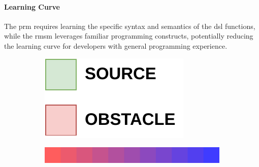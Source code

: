 \paragraph{Learning Curve}

The \ac{prm} requires learning the specific syntax and semantics of the \ac{dsl} functions, while the \ac{rmsm} leverages familiar programming constructs, potentially reducing the learning curve for developers with general programming experience.

\begin{figure}
    \centering
    \begin{subfigure}[b]{.15\textwidth}
        \centering
        \includegraphics[width=\textwidth]{figures/gradient-environment-legend.pdf}
        \label{fig:gradient-legend}
    \end{subfigure}
    \hfill
    \begin{subfigure}[b]{.49\textwidth}
        \centering
        \includegraphics[width=\textwidth]{figures/palette-cropped2.png}
        \label{fig:gradient-palette}
    \end{subfigure}
    \hfill
    \begin{subfigure}[b]{.49\textwidth}
        \centering

\end{subfigure}
\end{figure}
